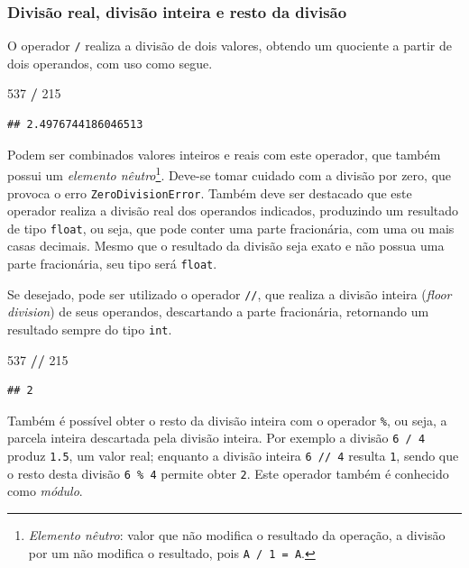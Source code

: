 \documentclass[
]{book}
\newenvironment{Shaded}{\begin{snugshade}}{\end{snugshade}}
\newcommand{\DecValTok}[1]{\textcolor[rgb]{0.00,0.00,0.81}{#1}}
\newcommand{\OperatorTok}[1]{\textcolor[rgb]{0.81,0.36,0.00}{\textbf{#1}}}
\begin{document}
\hypertarget{divisuxe3o-real-divisuxe3o-inteira-e-resto-da-divisuxe3o}{%
\subsubsection{Divisão real, divisão inteira e resto da divisão}\label{divisuxe3o-real-divisuxe3o-inteira-e-resto-da-divisuxe3o}}

O operador \texttt{/} realiza a divisão de dois valores, obtendo um quociente a partir de dois operandos, com uso como segue.

\begin{Shaded}
\begin{Highlighting}[]
\DecValTok{537} \OperatorTok{/} \DecValTok{215}
\end{Highlighting}
\end{Shaded}

\begin{verbatim}
## 2.4976744186046513
\end{verbatim}

Podem ser combinados valores inteiros e reais com este operador, que também possui um \emph{elemento nêutro}\footnote{\emph{Elemento nêutro}: valor que não modifica o resultado da operação, a divisão por um não modifica o resultado, pois \texttt{A\ /\ 1\ =\ A}.}. Deve-se tomar cuidado com a divisão por zero, que provoca o erro \texttt{ZeroDivisionError}. Também deve ser destacado que este operador realiza a divisão real dos operandos indicados, produzindo um resultado de tipo \texttt{float}, ou seja, que pode conter uma parte fracionária, com uma ou mais casas decimais. Mesmo que o resultado da divisão seja exato e não possua uma parte fracionária, seu tipo será \texttt{float}.

Se desejado, pode ser utilizado o operador \texttt{//}, que realiza a divisão inteira (\emph{floor division}) de seus operandos, descartando a parte fracionária, retornando um resultado sempre do tipo \texttt{int}.

\begin{Shaded}
\begin{Highlighting}[]
\DecValTok{537} \OperatorTok{//} \DecValTok{215}
\end{Highlighting}
\end{Shaded}

\begin{verbatim}
## 2
\end{verbatim}

Também é possível obter o resto da divisão inteira com o operador \texttt{\%}, ou seja, a parcela inteira descartada pela divisão inteira. Por exemplo a divisão \texttt{6\ /\ 4} produz \texttt{1.5}, um valor real; enquanto a divisão inteira \texttt{6\ //\ 4} resulta \texttt{1}, sendo que o resto desta divisão \texttt{6\ \%\ 4} permite obter \texttt{2}. Este operador também é conhecido como \emph{módulo}.
\end{document}
